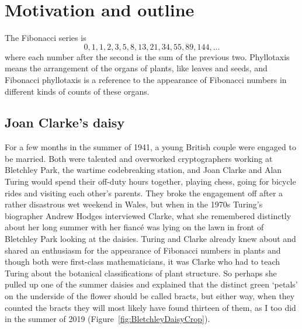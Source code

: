 

\chapter{Motivation and outline}
The Fibonacci series is
\[
0, 1, 1, 2, 3, 5,8, 13, 21, 34, 55, 89, 144, \dots
\] where each number after the second is the sum of the previous two. Phyllotaxis means the arrangement of the organs of plants, like leaves and seeds,  and Fibonacci phyllotaxis is a reference to the appearance of Fibonacci numbers in different kinds of counts of these organs. 

\section{Joan Clarke's daisy}

%
 For a few months in the summer of 1941, a young British couple were engaged to be married. Both were talented and overworked cryptographers working at Bletchley Park, the wartime codebreaking station, and  
 Joan Clarke and Alan Turing would spend their off-duty hours together, playing chess,  going for bicycle rides and visiting each other's parents. They broke the engagement off after a rather disastrous wet weekend in Wales, but when in the 1970s Turing's biographer Andrew Hodges interviewed Clarke, what she remembered distinctly about her long summer with her fianc\'e was lying on the lawn in front of Bletchley Park looking at the daisies. Turing and Clarke already knew about and shared an enthusiasm for the appearance of Fibonacci numbers in plants and though both were first-class mathematicians, it was Clarke who had to teach Turing about the botanical classifications of plant structure. So perhaps she  pulled up one of the summer daisies and explained that the distinct green `petals' on the underside of the flower should be called bracts, but either way, when they counted the bracts they will  most likely have found thirteen of them, as I too did in the summer of 2019 (Figure~\ref{fig:BletchleyDaisyCrop}).

